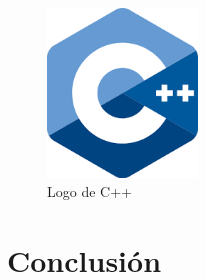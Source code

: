 \documentclass{article}
\begin{document}




\begin{figure}[h]
\includegraphics[width=4cm]{cpplogo.png}
\centering
\caption{Logo de C++}
\label{fig:cpplogo}
\end{figure}


\section{Conclusión} \label{conclulsion}



\end{document}
